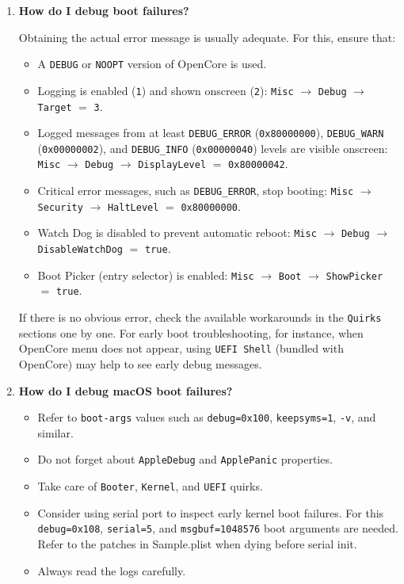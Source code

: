 \documentclass[]{article}
\providecommand{\tightlist}{%
  \setlength{\itemsep}{0pt}\setlength{\parskip}{0pt}}
\begin{document}
\begin{enumerate}
\item
  \textbf{How do I debug boot failures?}

  Obtaining the actual error message is usually adequate. For this, ensure that:
  \begin{itemize}
  \tightlist
  \item A \texttt{DEBUG} or \texttt{NOOPT} version of OpenCore is used.
  \item Logging is enabled (\texttt{1}) and shown onscreen (\texttt{2}):
  \texttt{Misc} $\rightarrow$ \texttt{Debug} $\rightarrow$ \texttt{Target}
  $=$ \texttt{3}.
  \item Logged messages from at least \texttt{DEBUG\_ERROR}
  (\texttt{0x80000000}), \texttt{DEBUG\_WARN} (\texttt{0x00000002}), and
  \texttt{DEBUG\_INFO} (\texttt{0x00000040}) levels are visible onscreen:
  \texttt{Misc} $\rightarrow$ \texttt{Debug} $\rightarrow$ \texttt{DisplayLevel}
  $=$ \texttt{0x80000042}.
  \item Critical error messages, such as \texttt{DEBUG\_ERROR}, stop booting:
  \texttt{Misc} $\rightarrow$ \texttt{Security}
  $\rightarrow$ \texttt{HaltLevel} $=$ \texttt{0x80000000}.
  \item Watch Dog is disabled to prevent automatic reboot:
  \texttt{Misc} $\rightarrow$ \texttt{Debug} $\rightarrow$
  \texttt{DisableWatchDog} $=$ \texttt{true}.
  \item Boot Picker (entry selector) is enabled: \texttt{Misc}
  $\rightarrow$ \texttt{Boot} $\rightarrow$ \texttt{ShowPicker} $=$ \texttt{true}.
  \end{itemize}

  If there is no obvious error, check the available workarounds in the \texttt{Quirks} sections
  one by one. For early boot troubleshooting, for instance, when OpenCore menu does not appear,
  using \texttt{UEFI Shell} (bundled with OpenCore) may help to see
  early debug messages.

\item
  \textbf{How do I debug macOS boot failures?}

  \begin{itemize}
  \tightlist
  \item Refer to \texttt{boot-args} values such as \texttt{debug=0x100}, \texttt{keepsyms=1},
    \texttt{-v}, and similar.
  \item Do not forget about \texttt{AppleDebug} and \texttt{ApplePanic} properties.
  \item Take care of \texttt{Booter}, \texttt{Kernel}, and \texttt{UEFI} quirks.
  \item Consider using serial port to inspect early kernel boot failures. For this
    \texttt{debug=0x108}, \texttt{serial=5}, and \texttt{msgbuf=1048576} boot arguments are needed.
    Refer to the patches in Sample.plist when dying before serial init.
  \item Always read the logs carefully.
  \end{itemize}


\end{enumerate}
\end{document}
